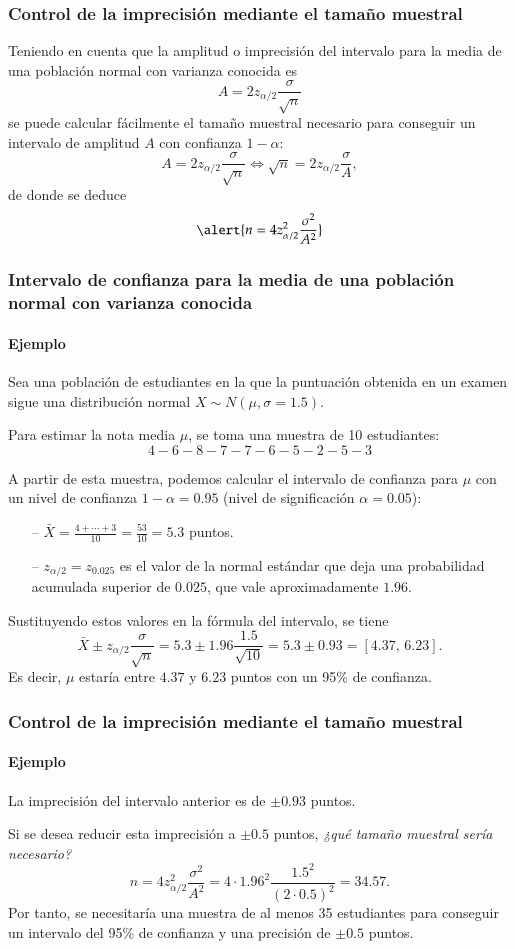 \begin{frame}
\frametitle{Control de la imprecisión mediante el tamaño muestral}
Teniendo en cuenta que la amplitud o imprecisión del intervalo para la media de una población normal con varianza conocida es
\[
A= 2 z_{\alpha/2}\frac{\sigma}{\sqrt{n}}
\]
se puede calcular fácilmente el tamaño muestral necesario para conseguir un intervalo de amplitud $A$ con confianza $1-\alpha$:
\[
A= 2 z_{\alpha/2}\frac{\sigma}{\sqrt{n}} \Leftrightarrow \sqrt{n}= 2 z_{\alpha/2}\frac{\sigma}{A},
\]
de donde se deduce
\[
\alert{n = 4 z_{\alpha/2}^2\frac{\sigma^2}{A^2}}
\]
\end{frame}


\begin{frame}
\frametitle{Intervalo de confianza para la media de una población normal con varianza conocida}
\framesubtitle{Ejemplo}
Sea una población de estudiantes en la que la puntuación obtenida en un examen sigue una distribución normal $X\sim N(\mu,\sigma=1.5)$.

Para estimar la nota media $\mu$, se toma una muestra de 10 estudiantes:
\[
4 - 6 - 8 - 7 - 7 - 6 - 5 - 2 - 5 - 3
\]

A partir de esta muestra, podemos calcular el intervalo de confianza para $\mu$ con un nivel de confianza $1-\alpha=0.95$ (nivel de significación $\alpha=0.05$):
\begin{itemize}
\item[--] $\bar X = \frac{4+\cdots+3}{10}= \frac{53}{10} = 5.3$ puntos.
\item[--] $z_{\alpha/2}=z_{0.025}$ es el valor de la normal estándar que deja una probabilidad acumulada superior de $0.025$, que vale aproximadamente $1.96$.
\end{itemize}
Sustituyendo estos valores en la fórmula del intervalo, se tiene
\[
\bar{X}\pm z_{\alpha/2}\frac{\sigma}{\sqrt{n}} = 5.3\pm 1.96\frac{1.5}{\sqrt{10}} = 5.3\pm 0.93 = \left[4.37,\,6.23\right].
\]
Es decir, $\mu$ estaría entre $4.37$ y $6.23$ puntos con un 95\% de confianza.
\end{frame}


\begin{frame}
\frametitle{Control de la imprecisión mediante el tamaño muestral}
\framesubtitle{Ejemplo}
La imprecisión del intervalo anterior es de $\pm 0.93$ puntos.

Si se desea reducir esta imprecisión a $\pm 0.5$ puntos, \emph{¿qué tamaño muestral sería necesario?}
\[
n = 4 z_{\alpha/2}^2\frac{\sigma^2}{A^2} = 4\cdot 1.96^2\frac{1.5^2}{(2\cdot 0.5)^2} = 34.57.
\]
Por tanto, se necesitaría una muestra de al menos 35 estudiantes para conseguir un intervalo del 95\% de confianza y una precisión de $\pm
0.5$ puntos.
\end{frame}


